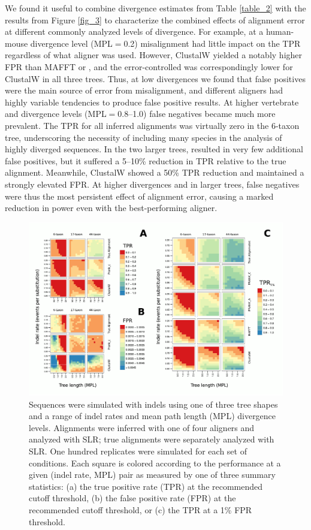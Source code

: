 \documentclass{mbe}
\begin{document}
We found it useful to combine divergence estimates from Table
\ref{table_2} with the results from Figure \ref{fig_3} to characterize
the combined effects of alignment error at different commonly analyzed
levels of divergence. For example, at a human-mouse divergence level
(MPL$=$0.2) misalignment had little impact on the TPR regardless of
what aligner was used. However, ClustalW yielded a notably higher FPR
than MAFFT or \prankc, and the error-controlled \tpr{} was
correspondingly lower for ClustalW in all three trees. Thus, at low
divergences we found that false positives were the main source of
error from misalignment, and different aligners had highly variable
tendencies to produce false positive results. At higher vertebrate and
\Dr divergence levels (MPL$=$0.8--1.0) false negatives became
much more prevalent. The TPR for all inferred alignments was virtually
zero in the 6-taxon tree, underscoring the necessity of including many
species in the analysis of highly diverged sequences. In the two
larger trees, \prankc resulted in very few additional false
positives, but it suffered a 5--10\% reduction in TPR relative to the
true alignment. Meanwhile, ClustalW showed a 50\% TPR reduction and
maintained a strongly elevated FPR. At higher divergences and in
larger trees, false negatives were thus the most persistent effect of
alignment error, causing a marked reduction in \sw power even with the
best-performing aligner.

\begin{figure}[t]
\begin{center}
\includegraphics[scale=0.8]{fig4.pdf}
\end{center}
\caption{Sequences were simulated with indels using one of three tree
  shapes and a range of indel rates and mean path length (MPL)
  divergence levels. Alignments were inferred with one of four
  aligners and analyzed with SLR; true alignments were separately
  analyzed with SLR. One hundred replicates were simulated for each
  set of conditions. Each square is colored according to the
  performance at a given (indel rate, MPL) pair as measured by one of
  three summary statistics: (a) the true positive rate (TPR) at the
  recommended cutoff threshold, (b) the false positive rate (FPR) at
  the recommended cutoff threshold, or (c) the TPR at a 1\% FPR
  threshold.}
\label{fig_4}
\end{figure}
\end{document}
